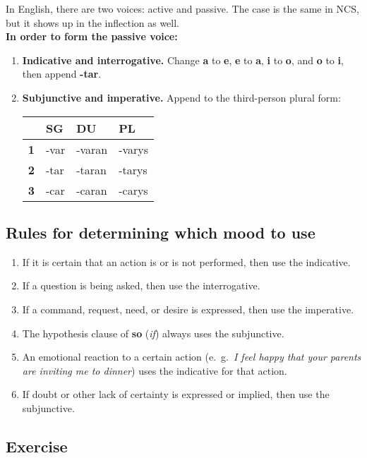 In English, there are two voices: active and passive. The case is the same in NCS, but it shows up in the inflection as well. \\
\textbf{In order to form the passive voice:}
\begin{enumerate}
  \item \textbf{Indicative and interrogative.} Change \textbf{a} to \textbf{e}, \textbf{e} to \textbf{a}, \textbf{i} to \textbf{o}, and \textbf{o} to \textbf{i}, then append \textbf{-tar}.
  \item \textbf{Subjunctive and imperative.} Append to the third-person plural form:
  \begin{center}
    \begin{tabular}{|r|l|l|l|}
      \hline
      & \textbf{SG} & \textbf{DU} & \textbf{PL} \\ \hline
      \textbf{1} & -var & -varan & -varys \\ \hline
      \textbf{2} & -tar & -taran & -tarys \\ \hline
      \textbf{3} & -car & -caran & -carys \\ \hline
    \end{tabular}
  \end{center}
\end{enumerate}

\subsection{Rules for determining which mood to use}

\begin{enumerate}
  \item If it is certain that an action is or is not performed, then use the indicative.
  \item If a question is being asked, then use the interrogative.
  \item If a command, request, need, or desire is expressed, then use the imperative.
  \item The hypothesis clause of \textbf{so} (\emph{if}) always uses the subjunctive.
  \item An emotional reaction to a certain action (e.~g.~\emph{I feel happy that your parents are inviting me to dinner}) uses the indicative for that action.
  \item If doubt or other lack of certainty is expressed or implied, then use the subjunctive.
\end{enumerate}

\subsection{Exercise}

